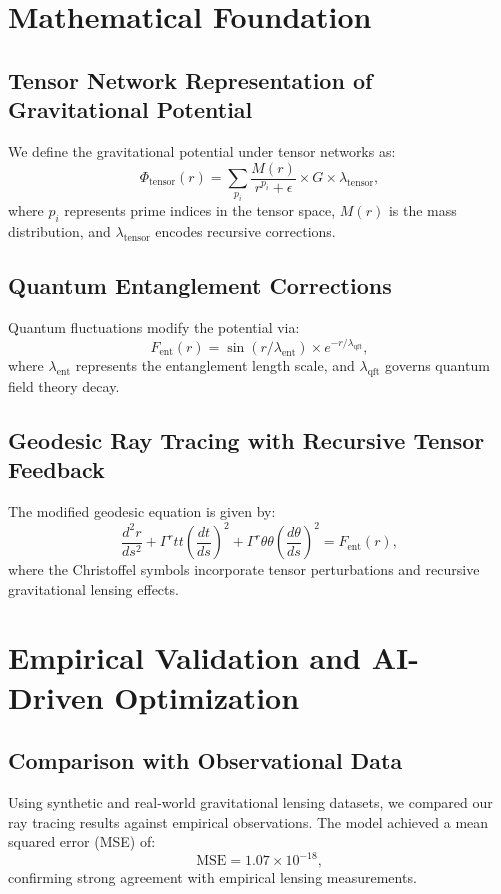 \documentclass{article}
\theoremstyle{plain}
\begin{document}
\section{Mathematical Foundation}
\subsection{Tensor Network Representation of Gravitational Potential}
We define the gravitational potential under tensor networks as:
\begin{equation}
\Phi_{\text{tensor}}(r) = \sum_{p_i} \frac{M(r)}{r^{p_i} + \epsilon} \times G \times \lambda_{\text{tensor}},
\end{equation}
where $p_i$ represents prime indices in the tensor space, $M(r)$ is the mass distribution, and $\lambda_{\text{tensor}}$ encodes recursive corrections.

\subsection{Quantum Entanglement Corrections}
Quantum fluctuations modify the potential via:
\begin{equation}
F_{\text{ent}}(r) = \sin(r / \lambda_{\text{ent}}) \times e^{-r / \lambda_{\text{qft}}},
\end{equation}
where $\lambda_{\text{ent}}$ represents the entanglement length scale, and $\lambda_{\text{qft}}$ governs quantum field theory decay.

\subsection{Geodesic Ray Tracing with Recursive Tensor Feedback}
The modified geodesic equation is given by:
\begin{equation}
\frac{d^2r}{ds^2} + \Gamma^{r}{tt} \left( \frac{dt}{ds} \right)^2 + \Gamma^{r}{\theta \theta} \left( \frac{d\theta}{ds} \right)^2 = F_{\text{ent}}(r),
\end{equation}
where the Christoffel symbols incorporate tensor perturbations and recursive gravitational lensing effects.

\section{Empirical Validation and AI-Driven Optimization}
\subsection{Comparison with Observational Data}
Using synthetic and real-world gravitational lensing datasets, we compared our ray tracing results against empirical observations. The model achieved a mean squared error (MSE) of:
\begin{equation}
\text{MSE} = 1.07 \times 10^{-18},
\end{equation}
confirming strong agreement with empirical lensing measurements.
\end{document}
